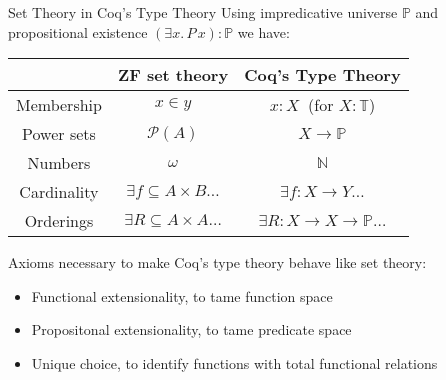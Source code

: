 \documentclass[xcolor=dvipsnames,compress,aspectratio=169,handout]{beamer}
\newcommand{\MBB}[1]{\ensuremath{\mathbb{#1}}\xspace}  %
\newcommand{\MCL}[1]{\ensuremath{\mathcal{#1}}\xspace} %
\newcommand{\Nat}{\MBB{N}}   %
\newcommand{\Pow}{\MCL P}
\newcommand{\Prop}{\MBB P}
\newcommand{\Type}{\MBB T}
\begin{document}
\begin{frame}{Set Theory in Coq's Type Theory}
	\vspace{0.2cm}
	Using impredicative universe $\Prop$ and propositional existence $(\exists x.\,P\,x):\Prop$ we have:
	
	\vspace{0.2cm}
	\begin{center}
	\begin{tabular}{c|c|c}
				&ZF set theory&Coq's Type Theory\\\hline
				\vphantom{\vdots}Membership&$x\in y$&$x:X~$ (for $X:\Type$)\\[0.2cm]
				Power sets&$\Pow(A)$&$X\to\Prop$\\[0.2cm]
				Numbers&$\omega$&$\Nat$\\[0.2cm]
				Cardinality&$\exists f\subseteq A\times B\dots$&$\exists f:X\to Y\dots$\\[0.2cm]
				Orderings&$\exists R\subseteq A\times A\dots$&$\exists R:X\to X\to\Prop\dots$
	\end{tabular}
	\end{center}
	
	\pause
	\vspace{0.2cm}
	Axioms necessary to make Coq's type theory behave like set theory:
	\begin{itemize}
	\item Functional extensionality, to tame function space
	\item Propositonal extensionality, to tame predicate space
	\item Unique choice, to identify functions with total functional relations
	\end{itemize}
\end{frame}

\newcommand{\trunc}[1]{||#1||}
\newcommand{\hprop}{\mathsf{hProp}}
\newcommand{\hset}{\mathsf{hSet}}
\newcommand{\Ord}{\mathsf{Ord}}
\end{document}
